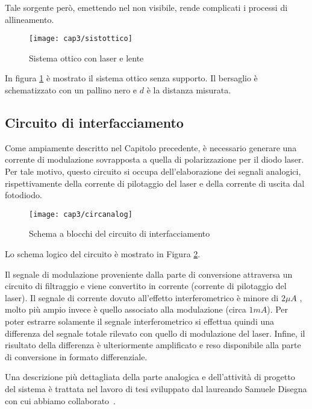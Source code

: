 Tale sorgente però, emettendo nel non visibile, rende complicati i processi di allineamento.
\begin{figure}  
  \begin{center}
    \texttt{[image: cap3/sistottico]}
    \caption{Sistema ottico con laser e lente}
    \label{sistottico}
  \end{center}
\end{figure}
In figura \ref{sistottico} è mostrato il sistema ottico senza supporto. Il bersaglio è schematizzato con un pallino nero e $d$ è la distanza misurata.

\subsection{Circuito di interfacciamento}
Come ampiamente descritto nel Capitolo precedente, è necessario generare una corrente di modulazione sovrapposta a quella di polarizzazione per il diodo laser. Per tale motivo, questo circuito si occupa dell'elaborazione dei segnali analogici, rispettivamente della corrente di pilotaggio del laser e della corrente di uscita dal fotodiodo.
\begin{figure}  
  \begin{center}
    \texttt{[image: cap3/circanalog]}
    \caption{Schema a blocchi del circuito di interfacciamento}
    \label{circanalog}
  \end{center}
\end{figure}

Lo schema logico del circuito è mostrato in Figura \ref{circanalog}. 

Il segnale di modulazione proveniente dalla parte di conversione attraversa un circuito di filtraggio e viene convertito in corrente (corrente di pilotaggio del laser).
Il segnale di corrente dovuto all'effetto interferometrico è minore di $2 \mu A$ , molto più ampio invece è quello associato alla modulazione (circa $1mA$). Per poter estrarre solamente il segnale interferometrico si effettua quindi una differenza del segnale totale rilevato con quello di modulazione del laser. Infine, il risultato della differenza è ulteriormente amplificato e reso disponibile alla parte di conversione in formato differenziale.

Una descrizione più dettagliata della parte analogica e dell'attività di progetto del sistema è trattata nel lavoro di tesi sviluppato dal laureando Samuele Disegna con cui abbiamo collaborato~\cite{thesissmldis}.

